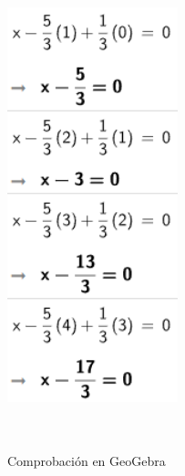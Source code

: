 \begin{itemize}
\begin{figure}[ht!]
        \includegraphics[width=140pt,height=400pt]{img/imagen14.png}
        \caption{Comprobación en GeoGebra}
    \end{figure}


\end{itemize}
